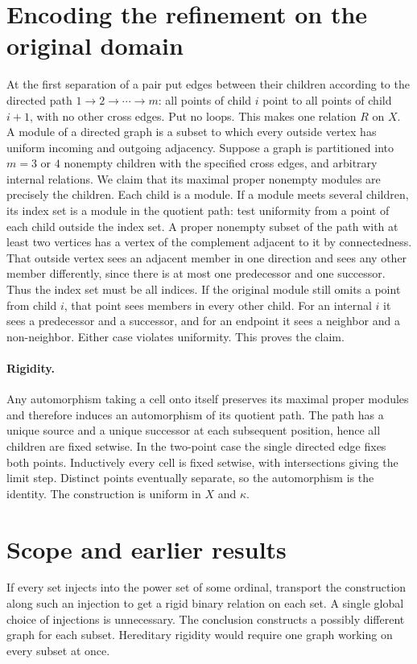 \documentclass[11pt]{article}
\begin{document}
\section{Encoding the refinement on the original domain}
At the first separation of a pair put edges between their children according to the directed path $1\to 2\to\cdots\to m$: all points of child $i$ point to all points of child $i+1$, with no other cross edges. Put no loops. This makes one relation $R$ on $X$.
A module of a directed graph is a subset to which every outside vertex has uniform incoming and outgoing adjacency. Suppose a graph is partitioned into $m=3$ or $4$ nonempty children with the specified cross edges, and arbitrary internal relations. We claim that its maximal proper nonempty modules are precisely the children. Each child is a module. If a module meets several children, its index set is a module in the quotient path: test uniformity from a point of each child outside the index set. A proper nonempty subset of the path with at least two vertices has a vertex of the complement adjacent to it by connectedness. That outside vertex sees an adjacent member in one direction and sees any other member differently, since there is at most one predecessor and one successor. Thus the index set must be all indices. If the original module still omits a point from child $i$, that point sees members in every other child. For an internal $i$ it sees a predecessor and a successor, and for an endpoint it sees a neighbor and a non-neighbor. Either case violates uniformity. This proves the claim.
\paragraph{Rigidity.} Any automorphism taking a cell onto itself preserves its maximal proper modules and therefore induces an automorphism of its quotient path. The path has a unique source and a unique successor at each subsequent position, hence all children are fixed setwise. In the two-point case the single directed edge fixes both points. Inductively every cell is fixed setwise, with intersections giving the limit step. Distinct points eventually separate, so the automorphism is the identity. The construction is uniform in $X$ and $\kappa$.
\section{Scope and earlier results}
If every set injects into the power set of some ordinal, transport the construction along such an injection to get a rigid binary relation on each set. A single global choice of injections is unnecessary. The conclusion constructs a possibly different graph for each subset. Hereditary rigidity would require one graph working on every subset at once.
\end{document}
